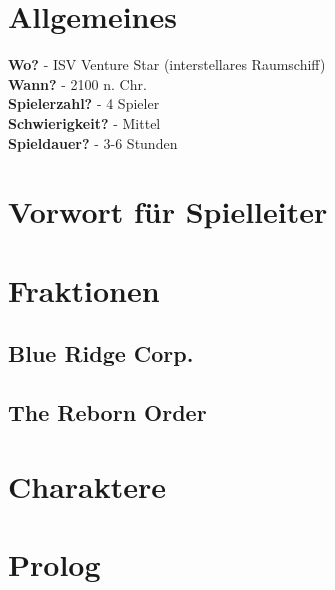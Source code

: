 
\section{Allgemeines}
\textbf{Wo?}            -  ISV Venture Star (interstellares Raumschiff) \\
\textbf{Wann?}          -  2100 n. Chr. \\
\textbf{Spielerzahl?}   -  4 Spieler \\
\textbf{Schwierigkeit?} -  Mittel \\
\textbf{Spieldauer?}    -  3-6 Stunden \\

\section{Vorwort für Spielleiter}

\section{Fraktionen}

\subsection{Blue Ridge Corp.}



\subsection{The Reborn Order}



\newpage

\section{Charaktere}

\subsection{}

\subsection{}

\newpage

\section{Prolog}

